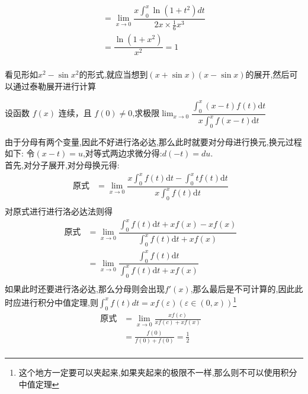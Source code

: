 \documentclass[9pt a4paper, oneside, UTF8]{ctexbook}
\begin{document}
\begin{sloppypar}
\begin{solution}
\begin{align*}
            & =  \lim_{x\to0}\dfrac{x\int_0^x\ln{(1+t^2)}dt}{2x \times \frac{1}{6}x^3} & \\
            & = \dfrac{\ln(1+x^2)}{x^2}=1  & \\
        \end{align*}
    \end{solution}
    \begin{note}
        看见形如$x^2-\sin x^2$的形式,就应当想到$(x+\sin x)(x-\sin x)$的展开,然后可以通过泰勒展开进行计算
    \end{note}
    \begin{problem}
        设函数 $f(x)$ 连续，且 $f(0)\neq0$,求极限$\operatorname*{lim}_{x\to0}{\dfrac{\int_{0}^{x}\left(x-t\right)f\left(t\right)\mathrm{d}t}{x\int_{0}^{x}f\left(x-t\right)\mathrm{d}t}}$
    \end{problem}
    \begin{solution}
        由于分母有两个变量,因此不好进行洛必达,那么此时就要对分母进行换元,换元过程如下:
        令$(x-t)=u$,对等式两边求微分得:$d(-t)=du$.\\
        首先,对分子展开,对分母换元得:
        \begin{align*}
            \text{原式} & = \lim_{x\to0}\dfrac{x\int_{0}^{x}f(t)\mathrm{d}t-\int_{0}^{x}tf\left(t\right)\mathrm{d}t}{x\int_{0}^{x}f(t)\mathrm{d}t}  & \\ 
        \end{align*}
        对原式进行进行洛必达法则得
        \begin{align*}
            \text{原式} & = \lim_{x\to0}\dfrac{\int_0^xf(t)\mathrm{d}t+xf(x)-xf(x)}{\int_0^xf(t)\mathrm{d}t+xf(x)} & \\
            & =  \lim\limits_{x\to0}\dfrac{\int_0^xf(t)\mathrm{d}t}{\int_0^xf(t)\mathrm{d}t+xf(x)} & \\  
        \end{align*}
        如果此时还要进行洛必达,那么分母则会出现$f'(x)$,那么最后是不可计算的,因此此时应进行积分中值定理,则$\int _0 ^x f(t)dt=xf(\varepsilon) (\varepsilon \in (0,x))$\footnote{这个地方一定要可以夹起来,如果夹起来的极限不一样,那么则不可以使用积分中值定理}
        \begin{align*}
            \text{原式} & = \lim_{x\to0}\frac{xf\left(c\right)}{xf\left(c\right)+xf\left(x\right)} & \\
            & = \frac{f(0)}{f(0)+f(0)}=\frac12 &\\ 
        \end{align*}
    \end{solution}
    \begin{note}

\end{note}
\end{sloppypar}
\end{document}
